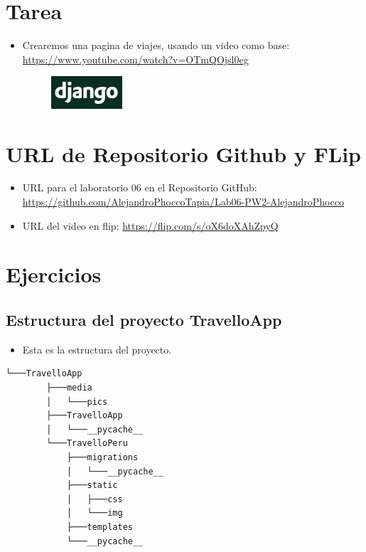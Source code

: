 \documentclass{article}
\begin{document}
    \section{Tarea}
	\begin{itemize}		
		\item Crearemos una pagina de viajes, usando un video como base: \url{https://www.youtube.com/watch?v=OTmQOjsl0eg}
            \begin{figure}[H]
    		\centering
    		\includegraphics[width=0.25\textwidth,keepaspectratio]{img/django.png}
    	\end{figure}
	\end{itemize}

	
    \section{URL de Repositorio Github y FLip}
 
        \begin{itemize}
    	\item URL para el laboratorio 06 en el Repositorio GitHub:                                 \url{https://github.com/AlejandroPhoccoTapia/Lab06-PW2-AlejandroPhocco}
            \item URL del video en flip: \url{https://flip.com/s/oX6doXAhZpyQ}
	\end{itemize}
	
    \section{Ejercicios}
 
        \subsection{Estructura del proyecto TravelloApp}
	\begin{itemize}	
	\item Esta es la estructura del proyecto.
	\end{itemize}
	
        \begin{lstlisting}[style=ascii-tree]
        └───TravelloApp
        ├───media
        │   └───pics
        ├───TravelloApp
        │   └───__pycache__
        └───TravelloPeru
            ├───migrations
            │   └───__pycache__
            ├───static
            │   ├───css
            │   └───img
            ├───templates
            └───__pycache__
        \end{lstlisting}  
 
\end{document}
